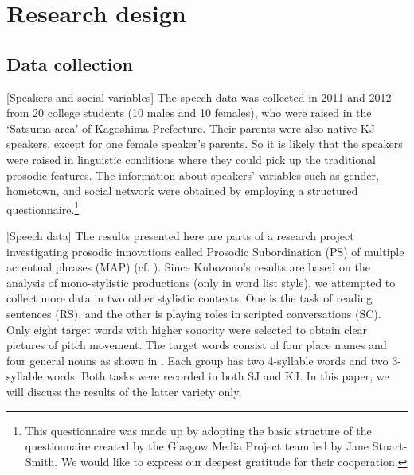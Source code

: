 \documentclass[output=paper]{LSP/langsci}
\begin{document}
\section{Research design}

\subsection{Data collection}

[Speakers and social variables] The speech data was collected in 2011 and 2012 from 20 college students (10 males and 10 females), who were raised in the ‘Satsuma area’ of Kagoshima Prefecture. Their parents were also native KJ speakers, except for one female speaker’s parents. So it is likely that the speakers were raised in linguistic conditions where they could pick up the traditional prosodic features. The information about speakers’ variables such as gender, hometown, and social network were obtained by employing a structured questionnaire.\footnote{ This questionnaire was made up by adopting the basic structure of the questionnaire created by the Glasgow Media Project team led by Jane Stuart-Smith. We would like to express our deepest gratitude for their cooperation.}

[Speech data] The results presented here are parts of a research project investigating prosodic innovations called Prosodic Subordination (PS) of multiple accentual phrases (MAP) (cf. \citealt{androutsopoulos_media_2014}). Since Kubozono’s results are based on the analysis of mono-stylistic productions (only in word list style), we attempted to collect more data in two other stylistic contexts. One is the task of reading sentences (RS), and the other is playing roles in scripted conversations (SC). Only eight target words with higher sonority were selected to obtain clear pictures of pitch movement. The target words consist of four place names and four general nouns as shown in . Each group has two 4-syllable words and two 3-syllable words. Both tasks were recorded in both SJ and KJ. In this paper, we will discuss the results of the latter variety only.
\end{document}
